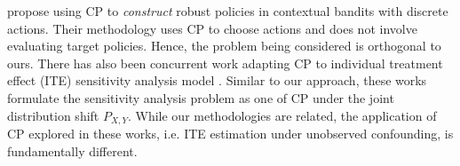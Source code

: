

\cite{osama2020learning} propose using CP to \textit{construct} robust policies in contextual bandits with discrete actions. Their methodology uses CP to choose actions and does not involve evaluating target policies. Hence, the problem being considered is orthogonal to ours. There has also been concurrent work adapting CP to individual treatment effect (ITE) sensitivity analysis model \citep{jin2021sensitivity, yin2021conformal}. Similar to our approach, these works formulate the sensitivity analysis problem as one of CP under the joint distribution shift $P_{X, Y}$. While our methodologies are related, the application of CP explored in these works, i.e. ITE estimation under unobserved confounding, is fundamentally different. 

